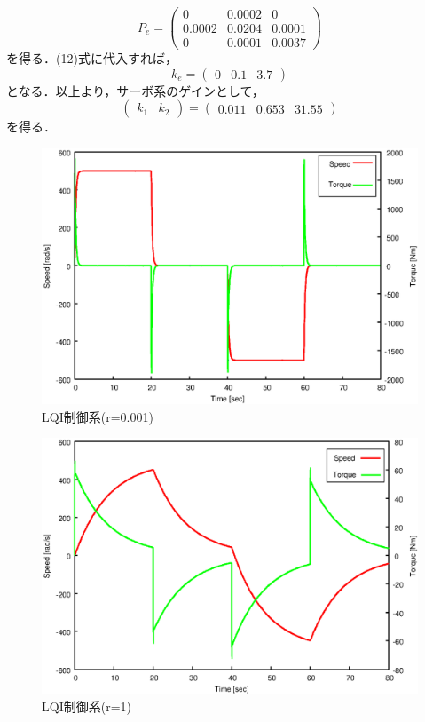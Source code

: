 \documentclass[a4paper,12pt]{jarticle}
\begin{document}
%
\begin{equation}
 P_e =
  \begin{pmatrix}
   0      & 0.0002 & 0 \\
   0.0002 & 0.0204 & 0.0001 \\
   0      & 0.0001 & 0.0037
  \end{pmatrix}
\end{equation}
%
を得る．(12)式に代入すれば，
%
\begin{equation}
 k_e =
  \begin{pmatrix}
   0 & 0.1 & 3.7
  \end{pmatrix}
\end{equation}
%
となる．以上より，サーボ系のゲインとして，
%
\begin{equation}
 \begin{pmatrix}
  k_1 & k_2
 \end{pmatrix}
 =
 \begin{pmatrix}
  0.011 & 0.653  & 31.55
 \end{pmatrix}
\end{equation}
%
を得る．
%
\begin{figure}[htbp]
 \begin{center}
  \includegraphics[width = 150mm]{fig/LQI_r0001.eps}
 \end{center}
 \caption{LQI制御系(r=0.001)}
 \label{fig:LQI_r0001}
\end{figure}
%
%
\begin{figure}[htbp]
 \begin{center}
  \includegraphics[width = 150mm]{fig/LQI_r1.eps}
 \end{center}
 \caption{LQI制御系(r=1)}
 \label{fig:LQI_r1}
\end{figure}
%
\end{document}
